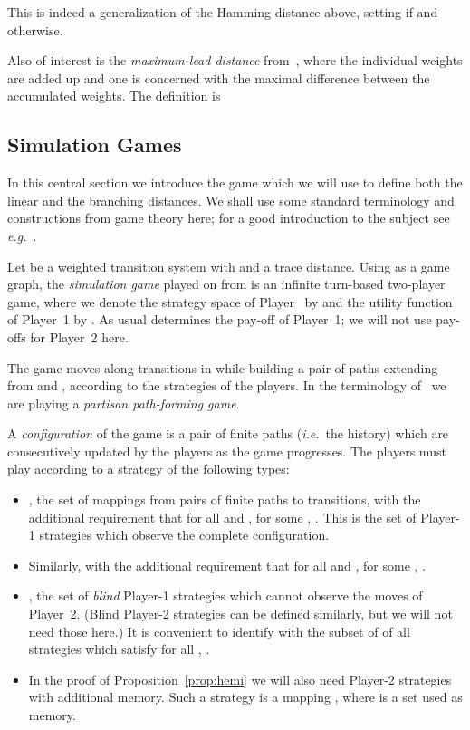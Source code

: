 \documentclass[copyright,creativecommons,sharealike]{eptcs}
\theoremstyle{plain}
\newcommand*\ie{\textit{i.e.}}
\newcommand*\eg{\textit{e.g.}}
\begin{document}
This is indeed a generalization of the Hamming distance above, setting
 if  and  otherwise.

Also of interest is the \emph{maximum-lead distance}
from~\cite{conf/formats/2005/HenzM05}, where the individual weights
are added up and one is concerned with the maximal difference between
the accumulated weights.  The definition is


\subsection{Simulation Games}
\label{se:wsg}

In this central section we introduce the game which we will use to
define both the linear and the branching distances.  We shall use some
standard terminology and constructions from game theory here; for a
good introduction to the subject see \eg~\cite{Ferguson}.

Let  be a weighted transition system with  and  a trace
distance. Using  as a game graph, the \emph{simulation game} played
on  from  is an infinite turn-based two-player game,
where we denote the strategy space of Player~ by  and the
utility function of Player~1 by .  As usual  determines the pay-off of Player~1; we will
not use pay-offs for Player~2 here.

The game moves along transitions in  while building a pair of paths
extending from  and , according to the strategies of the
players.  In the terminology
of~\cite{DBLP:journals/tcs/Bodlaender93,DBLP:journals/tcs/FraenkelS93}
we are playing a \emph{partisan path-forming game}.

A \emph{configuration} of the game is a pair of finite paths  (\ie~the history) which are
consecutively updated by the players as the game progresses.
The players must play according to a strategy of the following types: 
\begin{itemize}
\item , the set of
  mappings from pairs of finite paths to transitions, with the
  additional requirement that for all  and ,  for some , .  This
  is the set of Player-1 strategies which observe the complete
  configuration.
\item Similarly,  with the
  additional requirement that for all  and ,  for some , .
\item , the set of \emph{blind}
  Player-1 strategies which cannot observe the moves of Player~2.
  (Blind Player-2 strategies can be defined similarly, but we will not
  need those here.)  It is convenient to identify  with
  the subset of  of all strategies  which satisfy
   for all
  , .
\item In the proof of Proposition~\ref{prop:hemi} we will also need
  Player-2 strategies with additional memory.  Such a strategy is a
  mapping , where 
  is a set used as memory.
\end{itemize}
\end{document}
